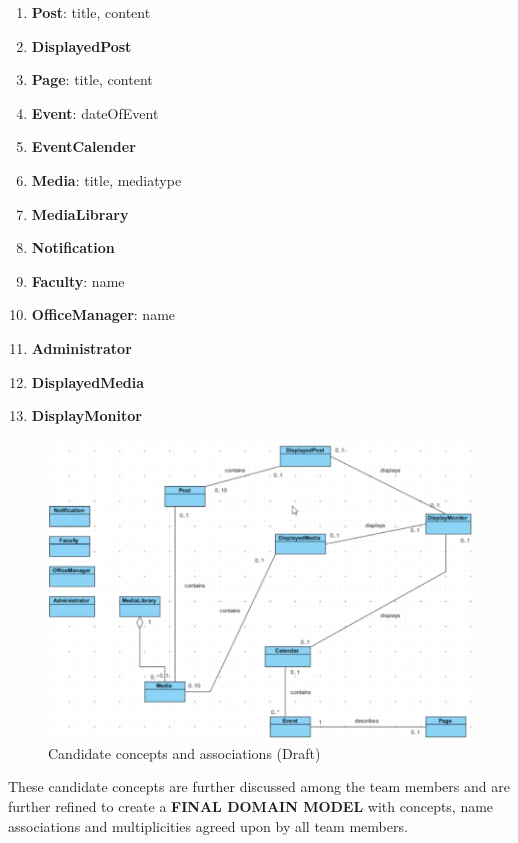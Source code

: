\documentclass{article}
\begin{document}
\vspace{2ex}
\begin{minipage}{0.325\textwidth}
    \begin{enumerate}
        \item \textbf{Post}: title, content
        \item \textbf{DisplayedPost}
        \item \textbf{Page}: title, content
        \item \textbf{Event}: dateOfEvent
        \item \textbf{EventCalender}
        \item \textbf{Media}: title, mediatype
        \item \textbf{MediaLibrary}
        \item \textbf{Notification}
        \item \textbf{Faculty}: name
        \item \textbf{OfficeManager}: name
        \item \textbf{Administrator}
        \item \textbf{DisplayedMedia}
        \item \textbf{DisplayMonitor}
    \end{enumerate}
\end{minipage}
%
\begin{minipage}{0.65\textwidth}
    \begin{figure}[H]
        \includegraphics[width=.9\textwidth,right]{./draft-Concepts.png}
        \caption{Candidate concepts and associations (Draft)}
        \label{fig:canidate}
    \end{figure}
\end{minipage}

\vspace{2ex}
These candidate concepts are further discussed among the team members and are further refined to create a \textbf{FINAL DOMAIN MODEL} with concepts, name associations and multiplicities agreed upon by all team members.
\end{document}

